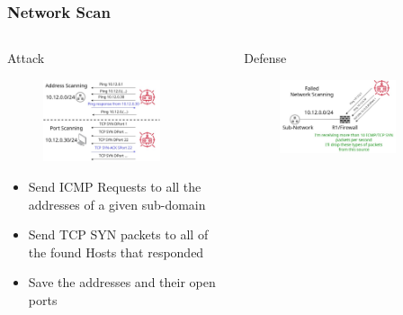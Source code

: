 \documentclass{beamer}
\begin{document}
\begin{frame}
\frametitle{Network Scan}
\begin{columns}
    \begin{column}{0.5\textwidth}
        \Large Attack
        \begin{figure}
            \centering
            \includegraphics[width=0.8\textwidth]{scan_attack.jpg}\\
        \end{figure}
            \begin{itemize}[label={}]
                \item \footnotesize Send ICMP Requests to all the addresses of a given sub-domain
                \item \footnotesize Send TCP SYN packets to all of the found Hosts that responded
               \item \footnotesize  Save the addresses and their open ports
            \end{itemize}
    \end{column}
    \begin{column}{0.5\textwidth}
        \Large Defense
        \begin{figure}
            \centering
            \includegraphics[width=0.8\textwidth]{scan_defense.jpg}\\

\end{figure}
\end{column}
\end{columns}
\end{frame}
\end{document}
